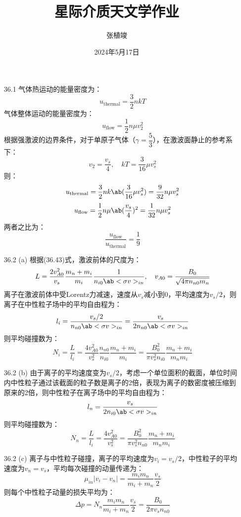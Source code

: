 \documentclass[a4paper,fontset=none]{ctexart}
\title{\textbf{星际介质天文学作业}}
\author{张植竣}
\date{2024年5月17日}
\begin{document}
\maketitle

\begin{enumerate}
    \item[36.1]
    气体热运动的能量密度为：
    \[
        u_{\mathrm{thermal}} = \frac{3}{2}nkT
    \]
    气体整体运动的能量密度为：
    \[
        u_{\mathrm{flow}} = \frac{1}{2}n\mu v_2^2
    \]
    根据强激波的边界条件，对于单原子气体（$\gamma = \dfrac{5}{3}$），在激波面静止的参考系下：
    \[
        v_2 = \frac{v_s}{4},\quad kT = \frac{3}{16}\mu v_s^2
    \]
    则：
    \[
        u_{\mathrm{thermal}} = \frac{3}{2}nk \ab(\frac{3}{16}\mu v_s^2) = \frac{9}{32}n\mu v_s^2
    \]
    \[
        u_{\mathrm{flow}} = \frac{1}{2}n\mu \ab(\frac{v_s}{4})^2 = \frac{1}{32}n\mu v_s^2
    \]
    两者之比为：
    \[
        \frac{u_{\mathrm{flow}}}{u_{\mathrm{thermal}}} = \frac{1}{9}
    \]

    \bigskip
    \item[36.2 (a)]
    根据(36.43)式，激波前体的尺度为：
    \[
        L = \frac{2v_{A0}^2}{v_s} \frac{m_n + m_i}{m_i} \frac{1}{n_{i0} \ab<\sigma v>_{in}},\quad v_{A0} = \frac{B_0}{\sqrt{4\pi n_{n0}m_n}}
    \]
    离子在激波前体中受Lorentz力减速，速度从$v_s$减小到$0$，平均速度为$v_s/2$，则离子在中性粒子场中的平均自由程为：
    \[
        l_i = \frac{v_s/2}{n_{n0} \ab<\sigma v>_{in}} = \frac{v_s}{2n_{n0} \ab<\sigma v>_{in}}
    \]
    则平均碰撞数为：
    \[
        N_i = \frac{L}{l_i} = \frac{4v_{A0}^2}{v_s^2} \frac{n_{n0}}{n_{i0}} \frac{m_n + m_i}{m_i} = \frac{B_0^2}{\pi v_s^2 n_{i0}} \frac{m_n + m_i}{m_n m_i}
    \]

    \medskip
    \item[36.2 (b)]
    由于离子的平均速度变为$v_s/2$，考虑一个单位面积的截面，单位时间内中性粒子通过该截面的粒子数是离子的2倍，表现为离子的数密度被压缩到原来的2倍，则中性粒子在离子场中的平均自由程为：
    \[
        l_n = \frac{v_s}{2n_{i0} \ab<\sigma v>_{in}}
    \]
    则平均碰撞数为：
    \[
        N_n = \frac{L}{l_i} = \frac{4v_{A0}^2}{v_s^2} = \frac{B_0^2}{\pi v_s^2 n_{n0}} \frac{m_n + m_i}{m_n m_i}
    \]

    \medskip
    \item[36.2 (c)]
    离子与中性粒子碰撞，离子的平均速度为$v_i = v_s/2$，中性粒子的平均速度为$v_n = v_s$，平均每次碰撞的动量传递为：
    \[
        \mu_{in} |v_i - v_n| = \frac{m_i m_n}{m_i + m_n} \frac{v_s}{2}
    \]
    则每个中性粒子动量的损失平均为：
    \[
        \Delta p = N_n \frac{m_i m_n}{m_i + m_n} \frac{v_s}{2} = \frac{B_0}{2\pi v_s n_{n0}}
    \]


\end{enumerate}
\end{document}
